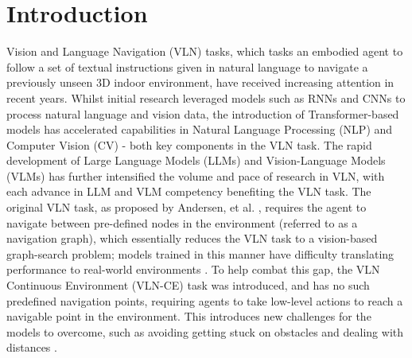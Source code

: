 \documentclass{svproc}
\begin{document}
\section{Introduction}
    Vision and Language Navigation (VLN) tasks, which tasks an embodied agent to follow a set of textual instructions given in natural language to navigate a previously unseen 3D indoor environment, have received increasing attention in recent years. Whilst initial research leveraged models such as RNNs and CNNs to process natural language and vision data, the introduction of Transformer-based models \cite{attenion_is_all_you_need} has accelerated capabilities in Natural Language Processing (NLP) and Computer Vision (CV) - both key components in the VLN task. The rapid development of Large Language Models (LLMs) and Vision-Language Models (VLMs) has further intensified the volume and pace of research in VLN, with each advance in LLM and VLM competency benefiting the VLN task.
    The original VLN task, as proposed by Andersen, et al. \cite{mattersim}, requires the agent to navigate between pre-defined nodes in the environment (referred to as a navigation graph), which essentially reduces the VLN task to a vision-based graph-search problem; models trained in this manner have difficulty translating performance to real-world environments \cite{pmlr-v155-anderson21a}. To help combat this gap, the VLN Continuous Environment (VLN-CE) task was introduced, and has no such predefined navigation points, requiring agents to take low-level actions to reach a navigable point in the environment. This introduces new challenges for the models to overcome, such as avoiding getting stuck on obstacles and dealing with distances \cite{krantz2020navgraphvisionandlanguagenavigationcontinuous}.
    \\ \\
\end{document}
